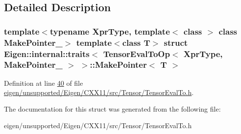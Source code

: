 \subsection{Detailed Description}
\subsubsection*{template$<$typename Xpr\+Type, template$<$ class $>$ class Make\+Pointer\+\_\+$>$\newline
template$<$class T$>$\newline
struct Eigen\+::internal\+::traits$<$ Tensor\+Eval\+To\+Op$<$ Xpr\+Type, Make\+Pointer\+\_\+ $>$ $>$\+::\+Make\+Pointer$<$ T $>$}



Definition at line \hyperlink{eigen_2unsupported_2_eigen_2_c_x_x11_2src_2_tensor_2_tensor_eval_to_8h_source_l00040}{40} of file \hyperlink{eigen_2unsupported_2_eigen_2_c_x_x11_2src_2_tensor_2_tensor_eval_to_8h_source}{eigen/unsupported/\+Eigen/\+C\+X\+X11/src/\+Tensor/\+Tensor\+Eval\+To.\+h}.



The documentation for this struct was generated from the following file\+:\begin{DoxyCompactItemize}
\item 
eigen/unsupported/\+Eigen/\+C\+X\+X11/src/\+Tensor/\+Tensor\+Eval\+To.\+h\end{DoxyCompactItemize}
